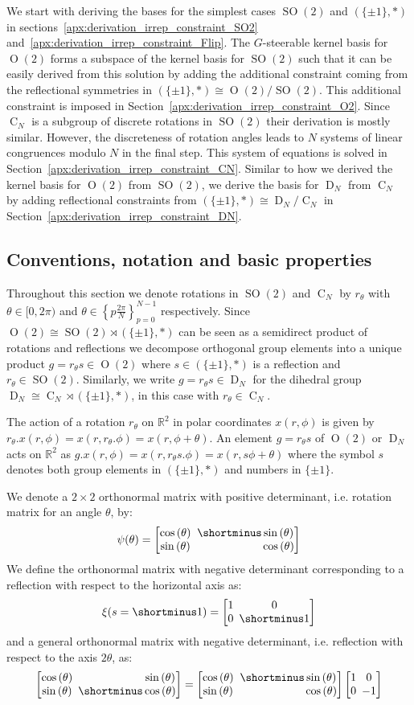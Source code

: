 \documentclass{article}
\newcommand{\lp}{\left(}
\newcommand{\rp}{\right)}
\renewcommand{\O}[1]{\ensuremath{\operatorname{O}(#1)}}
\newcommand{\SO}[1]{\ensuremath{\operatorname{SO}(#1)}}
\newcommand{\DN}{\ensuremath{\operatorname{D}_{\!N}}}
\newcommand{\CN}{\ensuremath{\operatorname{C}_{\!N}}}
\newcommand{\Flip}{(\{\pm 1\}, *)}
\newcommand{\PSI}[1]{
	\begin{bmatrix}
		\cos\lp#1\rp & \!\!\!         \shortminus \sin\lp#1\rp \\
		\sin\lp#1\rp & \!\!\!\phantom{\shortminus}\cos\lp#1\rp \\
	\end{bmatrix}
}
\newcommand{\PSIS}[1]{
	\begin{bmatrix}
		\cos\lp#1\rp & \!\!\!\phantom{\shortminus}\sin\lp#1\rp \\
		\sin\lp#1\rp & \!\!\!         \shortminus \cos\lp#1\rp \\
	\end{bmatrix}
}
\newcommand{\XI}[1]{
	\begin{bmatrix}
		1 & \!\!\! 0 \\
		0 & \!\!\! #1 \\
	\end{bmatrix}
}
\begin{document}
We start with deriving the bases for the simplest cases $\SO2$ and $\Flip$ in sections~\ref{apx:derivation_irrep_constraint_SO2} and~\ref{apx:derivation_irrep_constraint_Flip}.
The $G$-steerable kernel basis for $\O2$ forms a subspace of the kernel basis for $\SO2$ such that it can be easily derived from this solution by adding the additional constraint coming from the reflectional symmetries in $\Flip\cong\O2/\SO2$.
This additional constraint is imposed in Section~\ref{apx:derivation_irrep_constraint_O2}.
Since $\CN$ is a subgroup of discrete rotations in $\SO2$ their derivation is mostly similar.
However, the discreteness of rotation angles leads to $N$ systems of linear congruences modulo $N$ in the final step.
This system of equations is solved in Section~\ref{apx:derivation_irrep_constraint_CN}.
Similar to how we derived the kernel basis for $\O2$ from $\SO2$, we derive the basis for $\DN$ from $\CN$ by adding reflectional constraints from $\Flip\cong\DN/\CN$ in Section~\ref{apx:derivation_irrep_constraint_DN}.



\subsection{Conventions, notation and basic properties}
\label{apx:conventions}

Throughout this section we denote rotations in $\SO2$ and $\CN$ by $r_\theta$ with $\theta\in[0,2\pi)$ and $\theta\in\left\{p\frac{2\pi}{N}\right\}_{p=0}^{N-1}$ respectively.
Since $\O2\cong\SO2\rtimes\Flip$ can be seen as a semidirect product of rotations and reflections we decompose orthogonal group elements into a unique product $g=r_\theta s\in\O2$ where $s\in\Flip$ is a reflection and $r_\theta\in\SO2$.
Similarly, we write $g=r_\theta s\in\DN$ for the dihedral group $\DN\cong\CN\rtimes\Flip$, in this case with $r_\theta\in\CN$.

The action of a rotation $r_\theta$ on $\mathbb{R}^2$ in polar coordinates $x(r,\phi)$ is given by $r_\theta.x(r,\phi) = x(r,r_\theta.\phi) = x(r, \phi+\theta)$.
An element $g = r_{\theta}s$ of $\O2$ or $\DN$ acts on $\mathbb{R}^2$ as $ g.x(r, \phi) = x(r, r_\theta s.\phi) = x(r, s\phi + \theta)$ where the symbol $s$ denotes both group elements in $\Flip$ and numbers in $\{\pm1\}$.



We denote a $2\!\times\!2$ orthonormal matrix with positive determinant, i.e. rotation matrix for an angle $\theta$, by:
$$\psi(\theta) = \PSI{\theta}$$
We define the orthonormal matrix with negative determinant corresponding to a reflection with respect to the horizontal axis as:
$$\xi(s=\shortminus1)=\XI{\shortminus1}$$
and a general orthonormal matrix with negative determinant, i.e. reflection with respect to the axis $2\theta$, as:
$$\PSIS{\theta} = \PSI{\theta} \XI{-1}$$
\end{document}
